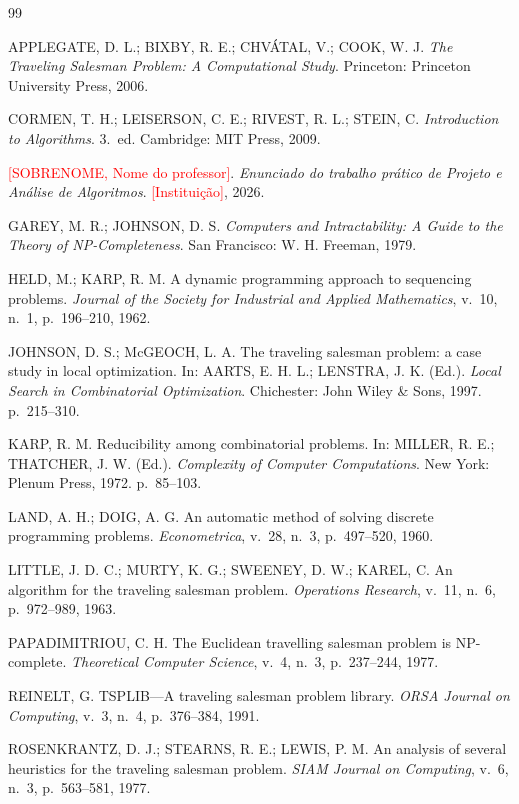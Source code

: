 \documentclass[12pt,a4paper]{article}
\newcommand{\pendente}[1]{\textcolor{red}{[#1]}}
\begin{document}
\begin{thebibliography}{99}

APPLEGATE, D. L.; BIXBY, R. E.; CHVÁTAL, V.; COOK, W. J.
\emph{The Traveling Salesman Problem: A Computational Study}.
Princeton: Princeton University Press, 2006.

CORMEN, T. H.; LEISERSON, C. E.; RIVEST, R. L.; STEIN, C.
\emph{Introduction to Algorithms}. 3.~ed.
Cambridge: MIT Press, 2009.

\pendente{SOBRENOME, Nome do professor}.
\emph{Enunciado do trabalho prático de Projeto e Análise de Algoritmos}.
\pendente{Instituição}, 2026.

GAREY, M. R.; JOHNSON, D. S.
\emph{Computers and Intractability: A Guide to the Theory of NP-Completeness}.
San Francisco: W. H. Freeman, 1979.

HELD, M.; KARP, R. M.
A dynamic programming approach to sequencing problems.
\emph{Journal of the Society for Industrial and Applied Mathematics}, v.~10, n.~1, p.~196--210, 1962.

JOHNSON, D. S.; McGEOCH, L. A.
The traveling salesman problem: a case study in local optimization.
In: AARTS, E. H. L.; LENSTRA, J. K. (Ed.).
\emph{Local Search in Combinatorial Optimization}.
Chichester: John Wiley \& Sons, 1997. p.~215--310.

KARP, R. M.
Reducibility among combinatorial problems.
In: MILLER, R. E.; THATCHER, J. W. (Ed.).
\emph{Complexity of Computer Computations}.
New York: Plenum Press, 1972. p.~85--103.

LAND, A. H.; DOIG, A. G.
An automatic method of solving discrete programming problems.
\emph{Econometrica}, v.~28, n.~3, p.~497--520, 1960.

LITTLE, J. D. C.; MURTY, K. G.; SWEENEY, D. W.; KAREL, C.
An algorithm for the traveling salesman problem.
\emph{Operations Research}, v.~11, n.~6, p.~972--989, 1963.

PAPADIMITRIOU, C. H.
The Euclidean travelling salesman problem is NP-complete.
\emph{Theoretical Computer Science}, v.~4, n.~3, p.~237--244, 1977.

REINELT, G.
TSPLIB---A traveling salesman problem library.
\emph{ORSA Journal on Computing}, v.~3, n.~4, p.~376--384, 1991.

ROSENKRANTZ, D. J.; STEARNS, R. E.; LEWIS, P. M.
An analysis of several heuristics for the traveling salesman problem.
\emph{SIAM Journal on Computing}, v.~6, n.~3, p.~563--581, 1977.

\end{thebibliography}
\end{document}
